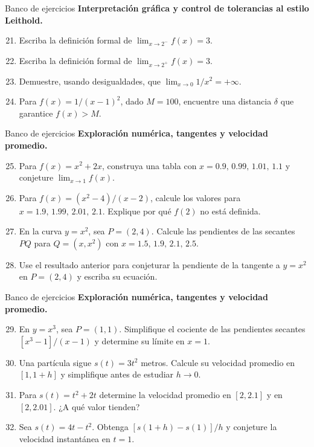 \documentclass[12pt,aspectratio=169]{beamer}
\begin{document}
\begin{frame}[t,allowframebreaks]{Banco de ejercicios}
\small
\noindent \textbf{Interpretación gráfica y control de tolerancias al estilo Leithold.}\par\smallskip
\begin{enumerate}\setcounter{enumi}{20}
\item Escriba la definición formal de $\lim_{x\to2^-}f(x)=3$.
\item Escriba la definición formal de $\lim_{x\to2^+}f(x)=3$.
\item Demuestre, usando desigualdades, que $\lim_{x\to0}1/x^2=+\infty$.
\item Para $f(x)=1/(x-1)^2$, dado $M=100$, encuentre una distancia $\delta$ que garantice $f(x)>M$.
\end{enumerate}
\end{frame}


\begin{frame}[t,allowframebreaks]{Banco de ejercicios}
\small
\noindent \textbf{Exploración numérica, tangentes y velocidad promedio.}\par\smallskip
\begin{enumerate}\setcounter{enumi}{24}
\item Para $f(x)=x^2+2x$, construya una tabla con $x=0.9,\,0.99,\,1.01,\,1.1$ y conjeture $\lim_{x\to1}f(x)$.
\item Para $f(x)=(x^2-4)/(x-2)$, calcule los valores para $x=1.9,\,1.99,\,2.01,\,2.1$. Explique por qué $f(2)$ no está definida.
\item En la curva $y=x^2$, sea $P=(2,4)$. Calcule las pendientes de las secantes $PQ$ para $Q=(x,x^2)$ con $x=1.5,\,1.9,\,2.1,\,2.5$.
\item Use el resultado anterior para conjeturar la pendiente de la tangente a $y=x^2$ en $P=(2,4)$ y escriba su ecuación.
\end{enumerate}
\end{frame}


\begin{frame}[t,allowframebreaks]{Banco de ejercicios}
\small
\noindent \textbf{Exploración numérica, tangentes y velocidad promedio.}\par\smallskip
\begin{enumerate}\setcounter{enumi}{28}
\item En $y=x^3$, sea $P=(1,1)$. Simplifique el cociente de las pendientes secantes $[x^3-1]/(x-1)$ y determine su límite en $x=1$.
\item Una partícula sigue $s(t)=3t^2$ metros. Calcule su velocidad promedio en $[1,1+h]$ y simplifique antes de estudiar $h\to0$.
\item Para $s(t)=t^2+2t$ determine la velocidad promedio en $[2,2.1]$ y en $[2,2.01]$. ¿A qué valor tienden?
\item Sea $s(t)=4t-t^2$. Obtenga $[s(1+h)-s(1)]/h$ y conjeture la velocidad instantánea en $t=1$.
\end{enumerate}
\end{frame}
\end{document}
